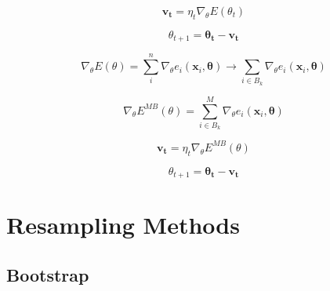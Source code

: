 \documentclass[a4paper,12pt, english]{article}
\begin{document}
\begin{equation}
\mathbf{v_t} = \eta_t \nabla_{\theta} E(\theta_t)
\end{equation}

\begin{equation}
\theta_{t+1} = \mathbf{\theta_t} - \mathbf{v_t}
\end{equation}

\begin{equation}
\nabla_{\theta} E(\theta) = \sum_i^n \nabla_{\theta} e_i(\mathbf{x}_i, \mathbf{\theta}) \longrightarrow \sum_{i \in B_k} \nabla_{\theta} e_i(\mathbf{x}_i, \mathbf{\theta})
\end{equation}

\begin{equation}
\nabla_{\theta} E^{MB} (\theta) = \sum_{i \in B_k}^M \nabla_{\theta} e_i(\mathbf{x}_i, \mathbf{\theta})
\end{equation}

\begin{equation}
\mathbf{v_t} = \eta_t \nabla_{\theta} E^{MB} (\theta)
\end{equation}

\begin{equation}
\theta_{t+1} = \mathbf{\theta_t} - \mathbf{v_t}
\end{equation}

\section{Resampling Methods}

\subsection{Bootstrap}
\end{document}

